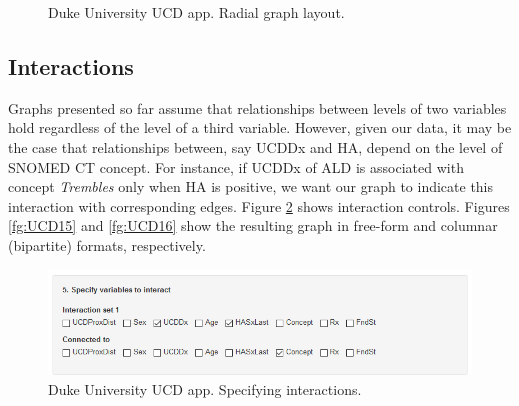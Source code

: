 \documentclass[10pt, letterpaper]{article}
\begin{document}
\begin{spacing}{1.0}
\begin{figure}[H]
    \centering
    \caption{Duke University UCD app.  Radial graph layout.}
    \label{fg:UCD13}
\end{figure}

\subsection{Interactions}

Graphs presented so far assume that relationships between levels of two variables hold regardless of the level of a third variable.  However, given our data, it may be the case that relationships between, say UCDDx and HA, depend on the level of SNOMED CT concept.  For instance, if UCDDx of ALD is associated with concept \textit{Trembles} only when HA is positive, we want our graph to indicate this interaction with corresponding edges.  Figure \ref{fg:UCD14} shows interaction controls.  Figures \ref{fg:UCD15} and \ref{fg:UCD16} show the resulting graph in free-form and columnar (bipartite) formats, respectively.

\vspace{0.25in} 

\begin{figure}[H]
    \includegraphics[width=4.5in]{UCD14.png}
    \centering
    \caption{Duke University UCD app.  Specifying interactions.}
    \label{fg:UCD14}
\end{figure}


\end{spacing}
\end{document}
